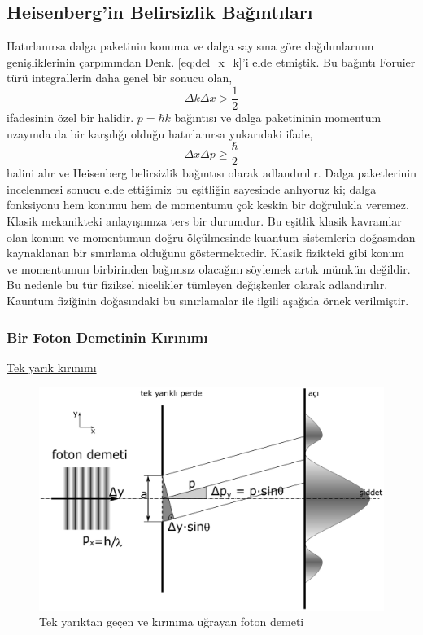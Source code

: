 \documentclass[a4paper,12pt, twoside]{article}
\begin{document}
\subsection{Heisenberg'in Belirsizlik Bağıntıları}

Hatırlanırsa dalga paketinin konuma ve dalga sayısına göre dağılımlarının genişliklerinin çarpımından Denk. \ref{eq:del_x_k}'i elde etmiştik. Bu bağıntı Foruier türü integrallerin daha genel bir sonucu olan,
\begin{equation}
\Delta k\Delta x >\dfrac {1}{2}
\end{equation}
ifadesinin özel bir halidir. $p = \hbar k$ bağıntısı ve dalga paketininin momentum uzayında da bir karşılığı olduğu hatırlanırsa yukarıdaki ifade,
\begin{equation}
\Delta x \Delta p \geq\dfrac {\hbar}{2}
\label{eq:heisenberg_uncertainty}
\end{equation}
halini alır ve Heisenberg belirsizlik bağıntısı olarak adlandırılır. Dalga paketlerinin incelenmesi sonucu elde ettiğimiz bu eşitliğin sayesinde anlıyoruz ki; dalga fonksiyonu hem konumu hem de momentumu çok keskin bir doğrulukla veremez. Klasik mekanikteki anlayışımıza ters bir durumdur. Bu eşitlik klasik kavramlar olan konum ve momentumun doğru ölçülmesinde kuantum sistemlerin doğasından kaynaklanan bir sınırlama olduğunu göstermektedir. Klasik fizikteki gibi konum ve momentumun birbirinden bağımsız olacağını söylemek artık mümkün değildir. Bu nedenle bu tür fiziksel nicelikler tümleyen değişkenler olarak adlandırılır.  Kauntum fiziğinin doğasındaki bu sınırlamalar ile ilgili aşağıda örnek verilmiştir.  

\subsubsection{Bir Foton Demetinin Kırınımı}

\href{https://opentextbc.ca/physicstestbook2/chapter/single-slit-diffraction/}{Tek yarık kırınımı}

\begin{figure}[hbtp]
	\centering
	\includegraphics[width=0.7\linewidth]{figurler/tek_yarik_deneyi.eps}
	\caption{Tek yarıktan geçen ve kırınıma uğrayan foton demeti}
	\label{fig:tekyarikdeneyi}
\end{figure}
\end{document}
